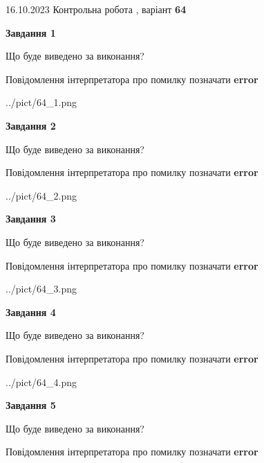 \documentclass[12pt, ukrainian]{article}
\begin{document}
{\Large{16.10.2023 Контрольна робота , варіант  \No \textbf { 64 }\par}}
{
\begin {large}
{\begin {center}\textbf{Завдання 1}\end {center}}\par
Що буде виведено за виконання? \par
Повідомлення інтерпретатора про помилку позначати \textbf{error}

\begin{center}
	{../pict/64_1.png}
\end{center}
\newpage

{\begin {center}\textbf{Завдання 2}\end {center}}\par
Що буде виведено за виконання? \par
Повідомлення інтерпретатора про помилку позначати \textbf{error}

\begin{center}
	{../pict/64_2.png}
\end{center}
\newpage

{\begin {center}\textbf{Завдання 3}\end {center}}\par
Що буде виведено за виконання? \par
Повідомлення інтерпретатора про помилку позначати \textbf{error}

\begin{center}
	{../pict/64_3.png}
\end{center}
\newpage

{\begin {center}\textbf{Завдання 4}\end {center}}\par
Що буде виведено за виконання? \par
Повідомлення інтерпретатора про помилку позначати \textbf{error}

\begin{center}
	{../pict/64_4.png}
\end{center}
\newpage

{\begin {center}\textbf{Завдання 5}\end {center}}\par
Що буде виведено за виконання? \par
Повідомлення інтерпретатора про помилку позначати \textbf{error}


\end{large}}
\end{document}
